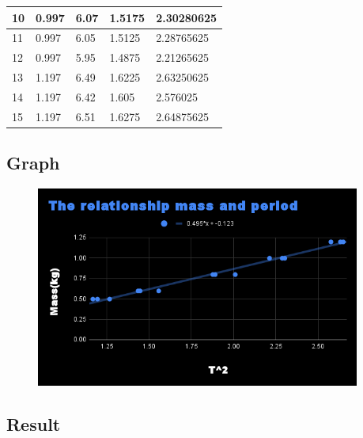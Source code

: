 \documentclass{report}
\begin{document}
\begin{table}[h!]
\begin{tabular}{|l|l|l|l|l|}
10                & 0.997             & 6.07               & 1.5175        & 2.30280625                                          \\ \hline
11                & 0.997             & 6.05               & 1.5125        & 2.28765625                                          \\ \hline
12                & 0.997             & 5.95               & 1.4875        & 2.21265625                                          \\ \hline
13                & 1.197             & 6.49               & 1.6225        & 2.63250625                                          \\ \hline
14                & 1.197             & 6.42               & 1.605         & 2.576025                                            \\ \hline
15                & 1.197             & 6.51               & 1.6275        & 2.64875625                                          \\ \hline
\end{tabular}
\end{table}


\subsection*{Graph}

\begin{figure}[h!]
  \begin{center}
    \includegraphics[width=0.95\textwidth]{figures/graph1.png}
  \end{center}
\end{figure}


\subsection*{Result}
\end{document}
